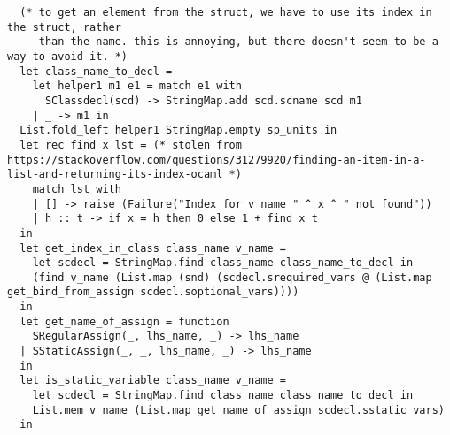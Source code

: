 \documentclass{article}
\begin{document}
\begin{verbatim}
  (* to get an element from the struct, we have to use its index in the struct, rather
     than the name. this is annoying, but there doesn't seem to be a way to avoid it. *)
  let class_name_to_decl =
    let helper1 m1 e1 = match e1 with
      SClassdecl(scd) -> StringMap.add scd.scname scd m1
    | _ -> m1 in
  List.fold_left helper1 StringMap.empty sp_units in
  let rec find x lst = (* stolen from https://stackoverflow.com/questions/31279920/finding-an-item-in-a-list-and-returning-its-index-ocaml *)
    match lst with
    | [] -> raise (Failure("Index for v_name " ^ x ^ " not found"))
    | h :: t -> if x = h then 0 else 1 + find x t
  in
  let get_index_in_class class_name v_name =
    let scdecl = StringMap.find class_name class_name_to_decl in
    (find v_name (List.map (snd) (scdecl.srequired_vars @ (List.map get_bind_from_assign scdecl.soptional_vars))))
  in
  let get_name_of_assign = function
    SRegularAssign(_, lhs_name, _) -> lhs_name
  | SStaticAssign(_, _, lhs_name, _) -> lhs_name
  in
  let is_static_variable class_name v_name =
    let scdecl = StringMap.find class_name class_name_to_decl in
    List.mem v_name (List.map get_name_of_assign scdecl.sstatic_vars)
  in


\end{verbatim}
\end{document}
